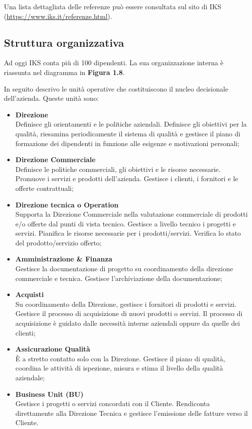Una lista dettagliata delle referenze può essere consultata sul sito
di IKS (\url{https://www.iks.it/referenze.html}).

\subsection{Struttura organizzativa}

Ad oggi IKS conta più di 100 dipendenti. La sua organizzazione interna è 
riassunta nel diagramma in \textbf{Figura 1.8}.

In seguito descrivo le unità operative che costituiscono il nucleo 
decisionale dell'azienda. 
Queste unità sono:
\begin{itemize}
	\item \textbf{Direzione}\\ 
	Definisce gli orientamenti e le politiche aziendali. Definisce gli 
	obiettivi per la qualità, riesamina periodicamente il sistema di 
	qualità e gestisce il piano di formazione dei dipendenti in funzione 
	alle esigenze e motivazioni personali;
	\item \textbf{Direzione Commerciale}\\
	Definisce le politiche commerciali, gli obiettivi e le risorse 
	necessarie. Promuove i servizi e prodotti dell'azienda. Gestisce i 
	clienti, i fornitori e le offerte contrattuali;
	\item \textbf{Direzione tecnica o Operation}\\
	Supporta la Direzione Commerciale nella valutazione commerciale di 
	prodotti e/o offerte dal punti di vista tecnico. Gestisce a livello 
	tecnico i progetti e servizi. Pianifica le risorse necessarie per 
	i prodotti/servizi. Verifica lo stato del prodotto/servizio offerto;	
	\item \textbf{Amministrazione \& Finanza}\\
	Gestisce la documentazione di progetto su coordinamento della direzione 
	commerciale e tecnica. Gestisce l'archiviazione della documentazione;
	\item \textbf{Acquisti}\\
	Su coordinamento della Direzione, gestisce i fornitori di prodotti e 
	servizi. Gestisce il processo di acquisizione di nuovi prodotti o 
	servizi. Il processo di acquisizione è guidato dalle necessità 
	interne aziendali oppure da quelle dei clienti;
	\item \textbf{Assicurazione Qualità}\\
	È a stretto contatto solo con la Direzione. Gestisce il piano di 
    qualità, coordina le attività di ispezione, misura e stima il livello 
	della qualità aziendale;
	\item \textbf{Business Unit (BU)}\\
	Gestisce i progetti o servizi concordati con il Cliente. Rendiconta 
	direttamente alla Direzione Tecnica e gestisce l'emissione delle 
	fatture verso il Cliente. 
\end{itemize}


